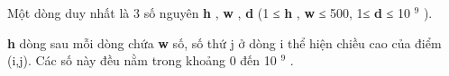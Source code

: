 Một dòng duy nhất là 3 số nguyên   \textbf{    h   }   ,   \textbf{    w   }   ,   \textbf{    d   }   (1 ≤   \textbf{    h   }   ,   \textbf{    w   }   ≤ 500, 1≤   \textbf{    d   }   ≤ 10   $^    9   $   ).  

\textbf{    h   }   dòng sau mỗi dòng chứa   \textbf{    w   }   số, số thứ j ở dòng i thể hiện chiều cao của điểm (i,j). Các số này đều nằm trong khoảng 0 đến 10   $^    9   $   .  

\